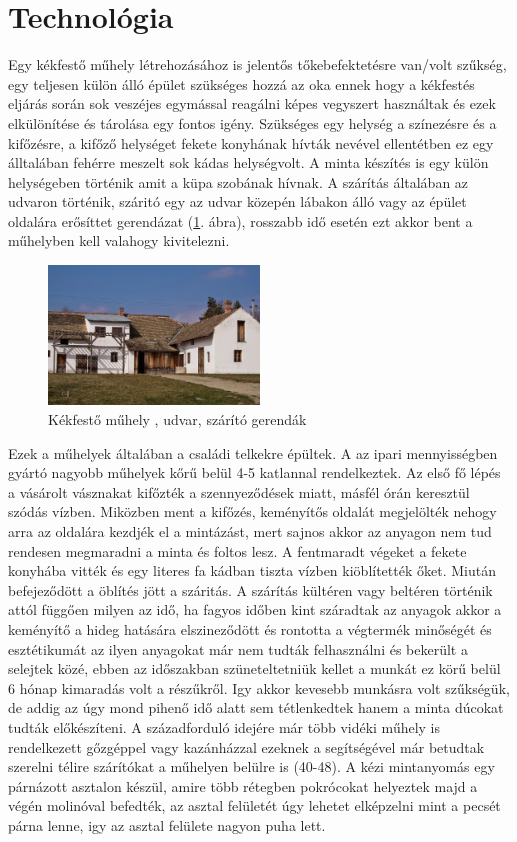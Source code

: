 \section{Technológia}
Egy kékfestő műhely létrehozásához is jelentős tőkebefektetésre van/volt szűkség, egy teljesen külön álló épület szükséges hozzá az oka ennek hogy a kékfestés eljárás során sok veszéjes egymással reagálni képes vegyszert használtak és ezek elkülönítése és tárolása egy fontos igény. Szükséges egy helység a színezésre és a kifőzésre, a  kifőző helységet fekete konyhának hívták nevével ellentétben ez egy álltalában fehérre meszelt sok kádas helységvolt. A minta készítés is egy külön helységeben történik amit a küpa szobának hívnak. A szárítás általában az udvaron történik, száritó egy az udvar közepén lábakon álló vagy az épület oldalára erősíttet gerendázat (\ref{fig:udvar}. ábra), rosszabb idő esetén ezt akkor bent a műhelyben  kell valahogy kivitelezni.

\begin{figure}[h!]
	\centering
	\includegraphics[width=0.5\textwidth]{img/udvar.jpg}
	\caption{Kékfestő műhely , udvar, szárító gerendák}
	\label{fig:udvar}
\end{figure}

Ezek a műhelyek általában a családi telkekre épültek. A az ipari mennyisségben gyártó nagyobb műhelyek kőrű belül 4-5 katlannal rendelkeztek. Az első fő lépés a vásárolt vásznakat kifőzték a szennyeződések miatt, másfél órán keresztül szódás vízben. Miközben ment a kifőzés, keményítős oldalát megjelölték nehogy arra az oldalára kezdjék el a mintázást, mert sajnos akkor az anyagon nem tud rendesen megmaradni a minta és foltos lesz. A  fentmaradt végeket a fekete konyhába vitték és egy literes fa kádban tiszta vízben kiöblítették őket. Miután befejeződött a öblítés jött a száritás. A szárítás kültéren vagy beltéren történik attól függően milyen az idő, ha fagyos időben kint száradtak az anyagok akkor a keményítő a hideg hatására elszineződött és rontotta a végtermék minőségét és esztétikumát az ilyen anyagokat már nem tudták felhasználni és bekerült a selejtek közé, ebben az időszakban szüneteltetniük kellet a munkát ez körű belül 6 hónap kimaradás volt a részűkről. Igy akkor kevesebb munkásra volt szűkségük, de addig az úgy mond pihenő idő alatt sem tétlenkedtek hanem a minta dúcokat tudták előkészíteni.
A századforduló idejére már több vidéki műhely is rendelkezett gőzgéppel vagy kazánházzal ezeknek a segítségével már betudtak szerelni télire szárítókat a műhelyen belülre is \cite{domonkos1981magyarorszagi}(40-48).
A kézi mintanyomás egy párnázott asztalon készül, amire több rétegben pokrócokat helyeztek majd a végén molinóval befedték, az asztal felületét úgy lehetet elképzelni mint a pecsét párna lenne, igy az asztal felülete nagyon puha lett.

